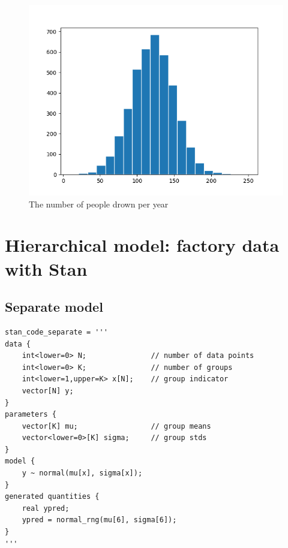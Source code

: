 \documentclass{article}
\begin{document}
\begin{figure}[H]
\centering  
\includegraphics[scale=0.5]{hist.png}
\caption{The number of people drown per year}
\label{fig: label}
\end{figure}


\section{Hierarchical model: factory data with Stan}

\subsection{Separate model}

\begin{verbatim}  
stan_code_separate = '''
data {
    int<lower=0> N;               // number of data points
    int<lower=0> K;               // number of groups
    int<lower=1,upper=K> x[N];    // group indicator
    vector[N] y;
}
parameters {
    vector[K] mu;                 // group means
    vector<lower=0>[K] sigma;     // group stds
}
model {
    y ~ normal(mu[x], sigma[x]);
}
generated quantities {
    real ypred;
    ypred = normal_rng(mu[6], sigma[6]);
}
'''
\end{verbatim}
\end{document}
